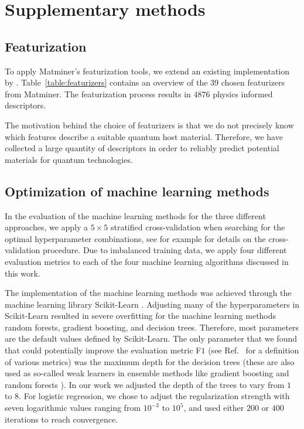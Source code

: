 \documentclass[superscriptaddress,unsortedaddress,
 amsmath,amssymb,
 aps,
]{revtex4-2}
\begin{document}
\newpage 

\section*{Supplementary methods}
\subsection*{Featurization}
To apply Matminer's featurization tools, we extend an existing implementation by \citeauthor{Breuck2021} \cite{Breuck2021}. 
Table~\ref{table:featurizers} contains an overview of the 39  chosen featurizers from Matminer. The featurization process results in $4876$ physics informed descriptors. 

The motivation behind the choice of featurizers is that we do not precisely know which features describe a suitable quantum host material.  Therefore, we have collected a large quantity of descriptors in order to reliably  predict potential materials for quantum technologies. 




\subsection*{Optimization of machine learning methods}

In the evaluation of the machine learning methods for the three different approaches, we apply a $5\times 5$ stratified cross-validation when searching for the optimal hyperparameter combinations, see for example \cite{Hastie2009} for details on the cross-validation procedure. Due to imbalanced training data, we apply four different evaluation metrics to each of the four machine learning algorithms discussed in this work. 

The implementation of the machine learning methods was achieved through the machine learning library Scikit-Learn \cite{Pedregosa2012}. Adjusting many of the hyperparameters in Scikit-Learn resulted in severe overfitting for the machine learning methods random forests, gradient boosting, and decision trees. Therefore, most parameters are the default values defined by Scikit-Learn. The only parameter that we found that could potentially improve the evaluation metric F$1$  (see Ref.~\cite{sammut2010,geron2022} for a definition of various metrics) was the maximum depth for the decision trees (these are also used as so-called weak learners in ensemble methods like gradient boosting and random forests \cite{geron2022}). In our work we adjusted 
the depth of the trees to vary from $1$ to $8$. For logistic regression, we chose to adjust the regularization strength with seven logarithmic values ranging from $10^{-3}$ to $10^{5}$, and used either $200$ or $400$ iterations to reach convergence. 
\end{document}
